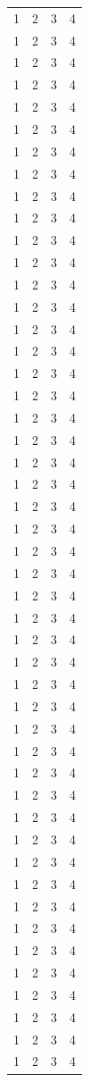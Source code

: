 \documentclass[12pt]{report}
\begin{document}
\begin{center}
\begin{longtable}{|c|c|c|c|}
1 & 2 & 3 & 4 \\ 1 & 2 & 3 & 4 \\ 1 & 2 & 3 & 4 \\ 1 & 2 & 3 & 4 \\
1 & 2 & 3 & 4 \\ 1 & 2 & 3 & 4 \\ 1 & 2 & 3 & 4 \\ 1 & 2 & 3 & 4 \\
1 & 2 & 3 & 4 \\ 1 & 2 & 3 & 4 \\ 1 & 2 & 3 & 4 \\ 1 & 2 & 3 & 4 \\
1 & 2 & 3 & 4 \\ 1 & 2 & 3 & 4 \\ 1 & 2 & 3 & 4 \\ 1 & 2 & 3 & 4 \\
1 & 2 & 3 & 4 \\ 1 & 2 & 3 & 4 \\ 1 & 2 & 3 & 4 \\ 1 & 2 & 3 & 4 \\
1 & 2 & 3 & 4 \\ 1 & 2 & 3 & 4 \\ 1 & 2 & 3 & 4 \\ 1 & 2 & 3 & 4 \\
1 & 2 & 3 & 4 \\ 1 & 2 & 3 & 4 \\ 1 & 2 & 3 & 4 \\ 1 & 2 & 3 & 4 \\
1 & 2 & 3 & 4 \\ 1 & 2 & 3 & 4 \\ 1 & 2 & 3 & 4 \\ 1 & 2 & 3 & 4 \\
1 & 2 & 3 & 4 \\ 1 & 2 & 3 & 4 \\ 1 & 2 & 3 & 4 \\ 1 & 2 & 3 & 4 \\
1 & 2 & 3 & 4 \\ 1 & 2 & 3 & 4 \\ 1 & 2 & 3 & 4 \\ 1 & 2 & 3 & 4 \\
1 & 2 & 3 & 4 \\ 1 & 2 & 3 & 4 \\ 1 & 2 & 3 & 4 \\ 1 & 2 & 3 & 4 \\
1 & 2 & 3 & 4 \\ 1 & 2 & 3 & 4 \\ 1 & 2 & 3 & 4 \\ 1 & 2 & 3 & 4 \\
\end{longtable}
\end{center} 
\end{document}
